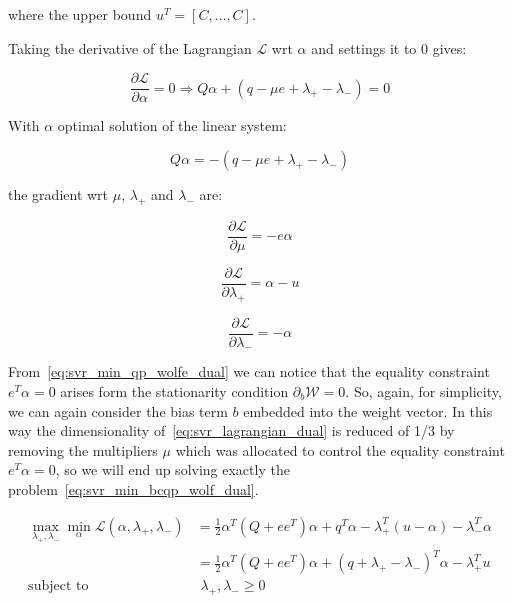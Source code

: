 where the upper bound $u^T = [C, \dots, C]$.

Taking the derivative of the Lagrangian $\mathcal{L}$ wrt $\alpha$ and settings it to 0 gives:

\begin{equation} \label{eq:svr_lagrangian_der_a}
	\frac{\partial \mathcal{L}}{\partial \alpha}=0\Rightarrow Q \alpha + (q - \mu e + \lambda_+ - \lambda_-) = 0
\end{equation}

With $\alpha$ optimal solution of the linear system:

\begin{equation} \label{eq:svr_lagrangian_sol}
    Q \alpha = - (q - \mu e + \lambda_+ - \lambda_-)
\end{equation}

the gradient wrt $\mu$, $\lambda_+$ and $\lambda_-$ are:

\begin{equation} \label{eq:svr_lagrangian_der_mu}
	\frac{\partial \mathcal{L}}{\partial \mu}=-e \alpha
\end{equation}

\begin{equation} \label{eq:svr_lagrangian_der_lp}
	\frac{\partial \mathcal{L}}{\partial \lambda_+}=\alpha - u
\end{equation}

\begin{equation} \label{eq:svr_lagrangian_der_lm}
    \frac{\partial \mathcal{L}}{\partial \lambda_-}=-\alpha
\end{equation}

From~\eqref{eq:svr_min_qp_wolfe_dual} we can notice that the equality constraint $e^T \alpha = 0$ arises form the stationarity condition $\partial_{{b}} \mathcal{W}=0$. So, again, for simplicity, we can again consider the bias term $b$ embedded into the weight vector. In this way the dimensionality of~\eqref{eq:svr_lagrangian_dual} is reduced of 1/3 by removing the multipliers $\mu$ which was allocated to control the equality constraint $e^T \alpha=0$, so we will end up solving exactly the problem~\eqref{eq:svr_min_bcqp_wolf_dual}.

\begin{equation} \label{eq:l1_svr_bcqp_lagrangian_dual}
	\begin{aligned}
    	\max_{\lambda_+,\lambda_-} \min_{\alpha} \mathcal{L}(\alpha,\lambda_+,\lambda_-) &= \frac{1}{2} \alpha^T (Q + ee^T)\alpha+q^T\alpha - \lambda_+^T (u - \alpha) - \lambda_-^T \alpha \\
    &= \frac{1}{2} \alpha^T (Q + ee^T)\alpha + (q + \lambda_+ - \lambda_-)^T \alpha - \lambda_+^T u \\
    \text{subject to} \quad & \,\, \lambda_+, \lambda_- \geq 0
	\end{aligned}
\end{equation}

